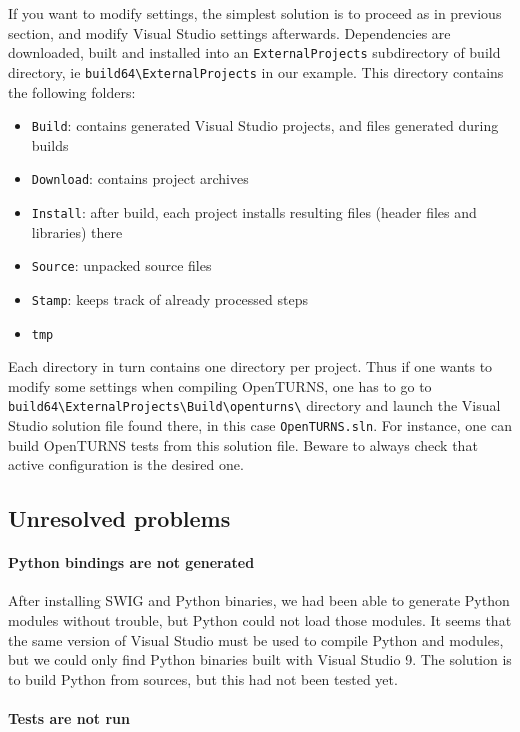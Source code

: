 If you want to modify settings, the simplest solution is to proceed as in previous section, and modify Visual Studio settings afterwards.
Dependencies are downloaded, built and installed into an \verb+ExternalProjects+ subdirectory of build directory, ie
\verb+build64\ExternalProjects+ in our example.  This directory contains the following folders:
\begin{itemize}
\item \texttt{Build}: contains generated Visual Studio projects, and files generated during builds
\item \texttt{Download}: contains project archives
\item \texttt{Install}: after build, each project installs resulting files (header files and libraries) there
\item \texttt{Source}: unpacked source files
\item \texttt{Stamp}: keeps track of already processed steps
\item \texttt{tmp}
\end{itemize}
Each directory in turn contains one directory per project.  Thus if one wants to modify some settings when compiling OpenTURNS,
one has to go to \verb+build64\ExternalProjects\Build\openturns\+ directory and launch the Visual Studio solution file found there,
in this case \texttt{OpenTURNS.sln}.  For instance, one can build OpenTURNS tests from this solution file.
Beware to always check that active configuration is the desired one.

\subsection{Unresolved problems}
\paragraph{Python bindings are not generated}

After installing SWIG and Python binaries, we had been able to generate Python modules without trouble, but Python could not load
those modules.  It seems that the same version of Visual Studio must be used to compile Python and modules, but we could only find
Python binaries built with Visual Studio 9.  The solution is to build Python from sources, but this had not been tested yet.

\paragraph{Tests are not run}

